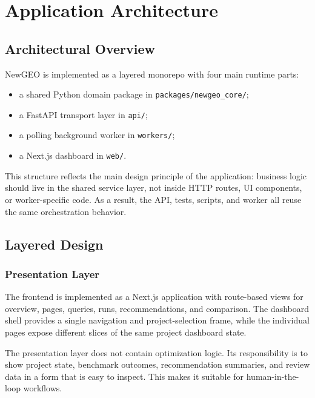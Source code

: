 
\chapter{Application Architecture}\label{chapter:architecture}

\section{Architectural Overview}

NewGEO is implemented as a layered monorepo with four main runtime parts:
\begin{itemize}
    \item a shared Python domain package in \texttt{packages/newgeo\_core/};
    \item a FastAPI transport layer in \texttt{api/};
    \item a polling background worker in \texttt{workers/};
    \item a Next.js dashboard in \texttt{web/}.
\end{itemize}

This structure reflects the main design principle of the application: business logic should live
in the shared service layer, not inside HTTP routes, UI components, or worker-specific code.
As a result, the API, tests, scripts, and worker all reuse the same orchestration behavior.

\section{Layered Design}

\subsection{Presentation Layer}

The frontend is implemented as a Next.js application with route-based views for overview,
pages, queries, runs, recommendations, and comparison. The dashboard shell provides a single
navigation and project-selection frame, while the individual pages expose different slices of the
same project dashboard state.

The presentation layer does not contain optimization logic. Its responsibility is to show project
state, benchmark outcomes, recommendation summaries, and review data in a form that is easy
to inspect. This makes it suitable for human-in-the-loop workflows.

